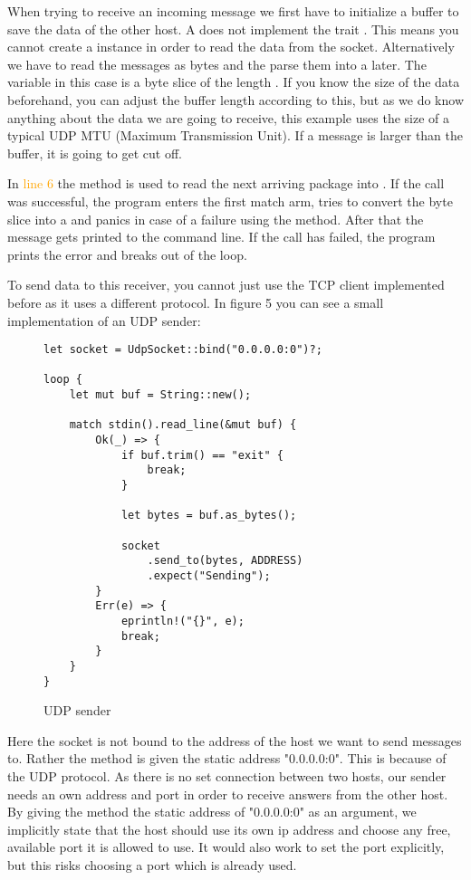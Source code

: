 When trying to receive an incoming message we first have to initialize a buffer to save the data of the other host.
A  does not implement the trait . This means you cannot create a 
instance in order to read the data from the socket. Alternatively we have to read the messages as bytes and the parse
them into a  later. The variable  in this case is a byte slice of the length . If you
know the size of the data beforehand, you can adjust the buffer length according to this, but as we do know anything
about the data we are going to receive, this example uses the size of a typical UDP MTU (Maximum Transmission Unit). If
a message is larger than the buffer, it is going to get cut off.

In \textcolor{orange}{line 6} the method  is used to read the next arriving package into . If
the call was successful, the program enters the first match arm, tries to convert the byte slice into a  and
panics in case of a failure using the  method. After that the message gets printed to the command line. If
the call has failed, the program prints the error and breaks out of the loop.

To send data to this receiver, you cannot just use the TCP client implemented before as it uses a different protocol. In
figure 5 you can see a small implementation of an UDP sender:

\begin{figure}[ht]
    \begin{verbatim}
let socket = UdpSocket::bind("0.0.0.0:0")?;

loop {
    let mut buf = String::new();

    match stdin().read_line(&mut buf) {
        Ok(_) => {
            if buf.trim() == "exit" {
                break;
            }

            let bytes = buf.as_bytes();

            socket
                .send_to(bytes, ADDRESS)
                .expect("Sending");
        }
        Err(e) => {
            eprintln!("{}", e);
            break;
        }
    }
}
    \end{verbatim}
    \caption{UDP sender}
\end{figure}

Here the socket is not bound to the address of the host we want to send messages to. Rather the  method is
given the static address "0.0.0.0:0". This is because of the UDP protocol. As there is no set connection between two
hosts, our sender needs an own address and port in order to receive answers from the other host. By giving the
 method the static address of "0.0.0.0:0" as an argument, we implicitly state that the host should use its
own ip address and choose any free, available port it is allowed to use. It would also work to set the port explicitly,
but this risks choosing a port which is already used.

